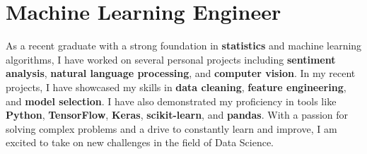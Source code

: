 
\section{Machine Learning Engineer}
\small{
    As a recent graduate with a strong foundation in \textbf{statistics} and machine learning algorithms, I have worked on several personal projects including \textbf{sentiment analysis}, \textbf{natural language processing}, and \textbf{computer vision}. In my recent projects, I have showcased my skills in \textbf{data cleaning}, \textbf{feature engineering}, and \textbf{model selection}. I have also demonstrated my proficiency in tools like \textbf{Python}, \textbf{TensorFlow}, \textbf{Keras}, \textbf{scikit-learn}, and \textbf{pandas}. With a passion for solving complex problems and a drive to constantly learn and improve, I am excited to take on new challenges in the field of Data Science.
}